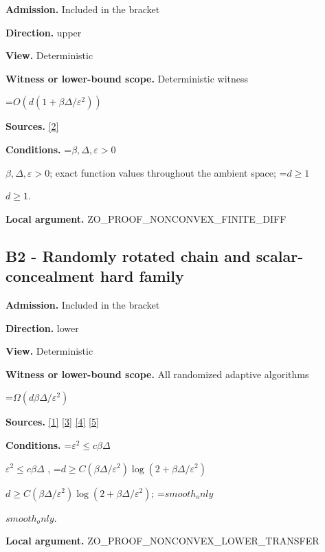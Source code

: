 \documentclass[10pt,a4paper]{article}
\newcommand{\AtlasMath}[1]{\par\begingroup\centering\setbox0=\hbox{$\displaystyle #1$}\ifdim\wd0>1.4\linewidth\typeout{ATLAS WIDE FORMULA: \the\wd0}\fi\ifdim\wd0>\linewidth\resizebox{\linewidth}{!}{\box0}\else\box0\fi\par\endgroup}
\newcommand{\AtlasInlineMath}[1]{\begingroup\setbox0=\hbox{$#1$}\ifdim\wd0>.4\linewidth\endgroup\AtlasMath{#1}\else\endgroup$#1$\fi}
\begin{document}
\textbf{Admission.} Included in the bracket



\textbf{Direction.} upper



\textbf{View.} Deterministic



\textbf{Witness or lower-bound scope.} Deterministic witness



\AtlasMath{O(d(1+\beta\Delta/\varepsilon^2))}


\textbf{Sources.} \href{https://arxiv.org/pdf/1309.5549}{[2]}



\textbf{Conditions.} \AtlasInlineMath{\beta ,\Delta ,\varepsilon >0}; exact function values throughout the ambient space; \AtlasInlineMath{d\ge 1}.



\textbf{Local argument.} ZO\_PROOF\_NONCONVEX\_FINITE\_DIFF



\subsection{B2 - Randomly rotated chain and scalar-concealment hard family}


\textbf{Admission.} Included in the bracket



\textbf{Direction.} lower



\textbf{View.} Deterministic



\textbf{Witness or lower-bound scope.} All randomized adaptive algorithms



\AtlasMath{\Omega(d\beta\Delta/\varepsilon^2)}


\textbf{Sources.} \href{https://arxiv.org/html/2610.19652v1}{[1]} \href{https://arxiv.org/html/2609.00045v3}{[3]} \href{https://arxiv.org/pdf/2610.00245v2}{[4]} \href{https://arxiv.org/html/2610.17074v1}{[5]}



\textbf{Conditions.} \AtlasInlineMath{\varepsilon ^2\le c\beta \Delta} , \AtlasInlineMath{d\ge C(\beta \Delta /\varepsilon ^2)\log(2+\beta \Delta /\varepsilon ^2)}; \AtlasInlineMath{smooth_only}.



\textbf{Local argument.} ZO\_PROOF\_NONCONVEX\_LOWER\_TRANSFER
\end{document}
